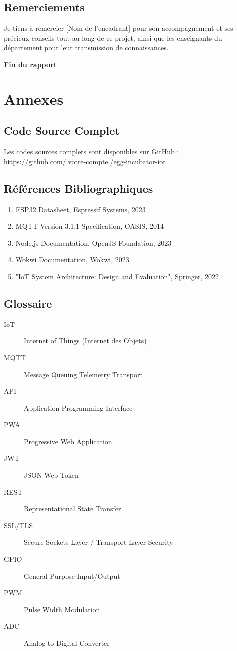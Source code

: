 \documentclass[12pt,a4paper]{article}
\begin{document}
\subsection{Remerciements}
Je tiens à remercier [Nom de l'encadrant] pour son accompagnement et ses précieux conseils tout au long de ce projet, ainsi que les enseignants du département pour leur transmission de connaissances.

\vspace{1cm}

\begin{center}
    \textbf{Fin du rapport}
\end{center}

\appendix
\section{Annexes}

\subsection{Code Source Complet}
Les codes sources complets sont disponibles sur GitHub :\\
\url{https://github.com/[votre-compte]/egg-incubator-iot}

\subsection{Références Bibliographiques}
\begin{enumerate}
    \item ESP32 Datasheet, Espressif Systems, 2023
    \item MQTT Version 3.1.1 Specification, OASIS, 2014
    \item Node.js Documentation, OpenJS Foundation, 2023
    \item Wokwi Documentation, Wokwi, 2023
    \item "IoT System Architecture: Design and Evaluation", Springer, 2022
\end{enumerate}

\subsection{Glossaire}
\begin{description}
    \item[IoT] Internet of Things (Internet des Objets)
    \item[MQTT] Message Queuing Telemetry Transport
    \item[API] Application Programming Interface
    \item[PWA] Progressive Web Application
    \item[JWT] JSON Web Token
    \item[REST] Representational State Transfer
    \item[SSL/TLS] Secure Sockets Layer / Transport Layer Security
    \item[GPIO] General Purpose Input/Output
    \item[PWM] Pulse Width Modulation
    \item[ADC] Analog to Digital Converter
\end{description}
\end{document}
